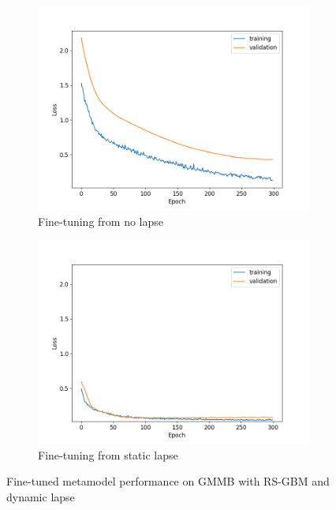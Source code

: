 \begin{figure}[ht!]
    \centering
    \begin{subfigure}{0.48\textwidth}
        \includegraphics[width=\textwidth]{./project3/figures/figure2a.png}
        \caption{Fine-tuning from no lapse} 
        \label{subfig3-2:fromNolapse}
    \end{subfigure}\hfill
    \begin{subfigure}{0.48\textwidth}
        \includegraphics[width=\textwidth]{./project3/figures/figure2b.png}
        \caption{Fine-tuning from static lapse}
        \label{subfig3-2:fromLapse}
    \end{subfigure}
    \caption{Fine-tuned metamodel performance on GMMB with RS-GBM and dynamic lapse}
    \label{fig3:figure2}
\end{figure}

